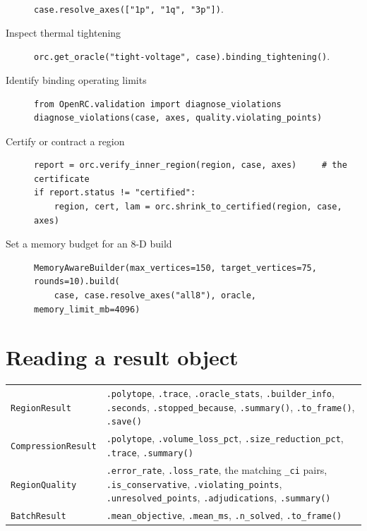 \documentclass[11pt,a4paper]{report}
\newcommand{\code}[1]{\texttt{\small #1}}
\begin{document}
\begin{description}
  \code{case.resolve\_axes(["1p", "1q", "3p"])}.
\item[Inspect thermal tightening]
  \code{orc.get\_oracle("tight-voltage", case).binding\_tightening()}.
\item[Identify binding operating limits]
\begin{lstlisting}
from OpenRC.validation import diagnose_violations
diagnose_violations(case, axes, quality.violating_points)
\end{lstlisting}
\item[Certify or contract a region]
\begin{lstlisting}
report = orc.verify_inner_region(region, case, axes)     # the certificate
if report.status != "certified":
    region, cert, lam = orc.shrink_to_certified(region, case, axes)
\end{lstlisting}
\item[Set a memory budget for an 8-D build]
\begin{lstlisting}
MemoryAwareBuilder(max_vertices=150, target_vertices=75, rounds=10).build(
    case, case.resolve_axes("all8"), oracle, memory_limit_mb=4096)
\end{lstlisting}
\end{description}

\section{Reading a result object}

\begin{center}\small
\begin{tabular}{@{}>{\raggedright\arraybackslash}p{3.2cm}>{\raggedright\arraybackslash}p{11.3cm}@{}}
\toprule
\code{RegionResult} & \code{.polytope}, \code{.trace}, \code{.oracle\_stats},
  \code{.builder\_info}, \code{.seconds}, \code{.stopped\_because},
  \code{.summary()}, \code{.to\_frame()}, \code{.save()} \\
\code{CompressionResult} & \code{.polytope}, \code{.volume\_loss\_pct},
  \code{.size\_reduction\_pct}, \code{.trace}, \code{.summary()} \\
\code{RegionQuality} & \code{.error\_rate}, \code{.loss\_rate}, the matching
  \code{\_ci} pairs, \code{.is\_conservative}, \code{.violating\_points},
  \code{.unresolved\_points}, \code{.adjudications}, \code{.summary()} \\
\code{BatchResult} & \code{.mean\_objective}, \code{.mean\_ms},
  \code{.n\_solved}, \code{.to\_frame()} \\
\bottomrule
\end{tabular}
\end{center}
\end{document}

